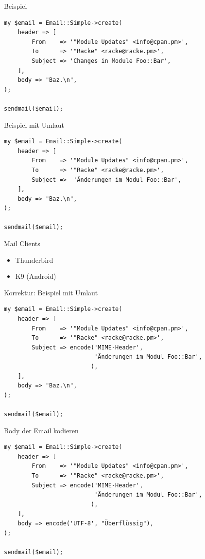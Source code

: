 \begin{frame}[fragile]{Beispiel}
  \begin{lstlisting}
my $email = Email::Simple->create(
    header => [
        From    => '"Module Updates" <info@cpan.pm>',
        To      => '"Racke" <racke@racke.pm>',
        Subject => 'Changes in Module Foo::Bar',
    ],
    body => "Baz.\n",
);

sendmail($email);
  \end{lstlisting}
\end{frame}

\begin{frame}[fragile]{Beispiel mit Umlaut}
  \begin{lstlisting}
my $email = Email::Simple->create(
    header => [
        From    => '"Module Updates" <info@cpan.pm>',
        To      => '"Racke" <racke@racke.pm>',
        Subject =>  'Änderungen im Modul Foo::Bar',
    ],
    body => "Baz.\n",
);

sendmail($email);
  \end{lstlisting}
\end{frame}

\begin{frame}[fragile]{Mail Clients}

  \begin{itemize}
  \item[\goodsmile] Thunderbird
  \item[\sadsmile] K9 (Android)
  \end{itemize}

\end{frame}

\begin{frame}[fragile]{Korrektur: Beispiel mit Umlaut}
  \begin{lstlisting}
my $email = Email::Simple->create(
    header => [
        From    => '"Module Updates" <info@cpan.pm>',
        To      => '"Racke" <racke@racke.pm>',
        Subject => encode('MIME-Header', 
                          'Änderungen im Modul Foo::Bar',
                         ),
    ],
    body => "Baz.\n",
);

sendmail($email);
  \end{lstlisting}
\end{frame}

\begin{frame}[fragile]{Body der Email kodieren}
  \begin{lstlisting}
my $email = Email::Simple->create(
    header => [
        From    => '"Module Updates" <info@cpan.pm>',
        To      => '"Racke" <racke@racke.pm>',
        Subject => encode('MIME-Header',
                          'Änderungen im Modul Foo::Bar',
                         ),
    ],
    body => encode('UTF-8', "Überflüssig"),
);

sendmail($email);
  \end{lstlisting}
\end{frame}

